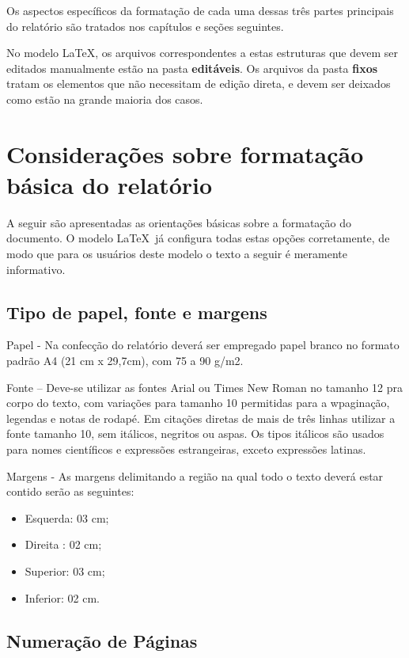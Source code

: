 Os aspectos específicos da formatação de cada uma dessas três partes 
principais do relatório são tratados nos capítulos e seções seguintes.

No modelo \LaTeX, os arquivos correspondentes a estas estruturas que devem
ser editados manualmente estão na pasta \textbf{editáveis}. Os arquivos
da pasta \textbf{fixos} tratam os elementos que não necessitam de 
edição direta, e devem ser deixados como estão na grande maioria dos casos.

\section{Considerações sobre formatação básica do relatório}

A seguir são apresentadas as orientações básicas sobre a formatação do
documento. O modelo \LaTeX\ já configura todas estas opções corretamente,
de modo que para os usuários deste modelo o texto a seguir é meramente
informativo.

\subsection{Tipo de papel, fonte e margens}

Papel - Na confecção do relatório deverá ser empregado papel branco no 
formato padrão A4 (21 cm x 29,7cm), com 75 a 90 g/m2.

Fonte – Deve-se utilizar as fontes Arial ou Times New Roman no tamanho 12 
pra corpo do texto, com variações para tamanho 10 permitidas para a 
wpaginação, legendas e notas de rodapé. Em citações diretas de mais de três 
linhas utilizar a fonte tamanho 10, sem itálicos, negritos ou aspas. Os 
tipos itálicos são usados para nomes científicos e expressões estrangeiras, 
exceto expressões latinas.

Margens - As margens delimitando a região na qual todo o texto deverá estar 
contido serão as seguintes: 

\begin{itemize}
	\item Esquerda: 03 cm;
	\item Direita	: 02 cm;
	\item Superior: 03 cm;
	\item Inferior: 02 cm. 
\end{itemize}

\subsection{Numeração de Páginas}

